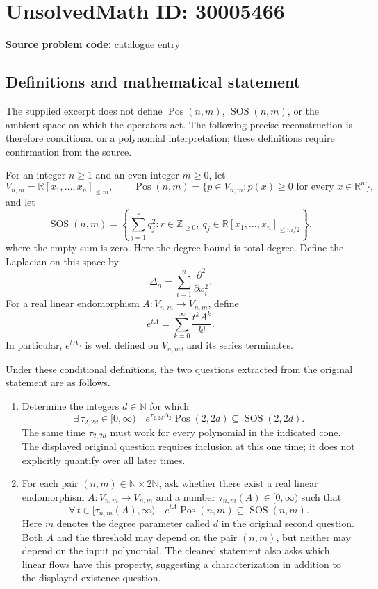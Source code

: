 \documentclass[11pt]{article}
\newcommand{\N}{\mathbb{N}}
\newcommand{\Z}{\mathbb{Z}}
\newcommand{\R}{\mathbb{R}}
\begin{document}
\section*{UnsolvedMath ID: 30005466}
\textbf{Source problem code:} catalogue entry
\subsection{Definitions and mathematical statement}
The supplied excerpt does not define \(\operatorname{Pos}(n,m)\), \(\operatorname{SOS}(n,m)\), or the ambient space on which the operators act. The following precise reconstruction is therefore conditional on a polynomial interpretation; these definitions require confirmation from the source.

For an integer \(n\geq 1\) and an even integer \(m\geq 0\), let
\[
V_{n,m}=\R[x_1,\ldots,x_n]_{\leq m},
\qquad
\operatorname{Pos}(n,m)=\{p\in V_{n,m}:p(x)\geq 0\text{ for every }x\in\R^n\},
\]
and let
\[
\operatorname{SOS}(n,m)=\left\{\sum_{j=1}^{r}q_j^2:r\in\Z_{\geq 0},\ q_j\in\R[x_1,\ldots,x_n]_{\leq m/2}\right\},
\]
where the empty sum is zero. Here the degree bound is total degree. Define the Laplacian on this space by
\[
\Delta_n=\sum_{i=1}^{n}\frac{\partial^2}{\partial x_i^2}.
\]
For a real linear endomorphism \(A:V_{n,m}\to V_{n,m}\), define
\[
e^{tA}=\sum_{k=0}^{\infty}\frac{t^kA^k}{k!}.
\]
In particular, \(e^{t\Delta_n}\) is well defined on \(V_{n,m}\), and its series terminates.

Under these conditional definitions, the two questions extracted from the original statement are as follows.
\begin{enumerate}
\item Determine the integers \(d\in\N\) for which
\[
\exists\,\tau_{2,2d}\in[0,\infty)\quad
 e^{\tau_{2,2d}\Delta_2}\operatorname{Pos}(2,2d)
 \subseteq\operatorname{SOS}(2,2d).
\]
The same time \(\tau_{2,2d}\) must work for every polynomial in the indicated cone. The displayed original question requires inclusion at this one time; it does not explicitly quantify over all later times.
\item For each pair \((n,m)\in\N\times2\N\), ask whether there exist a real linear endomorphism \(A:V_{n,m}\to V_{n,m}\) and a number \(\tau_{n,m}(A)\in[0,\infty)\) such that
\[
\forall\,t\in[\tau_{n,m}(A),\infty)\quad
 e^{tA}\operatorname{Pos}(n,m)
 \subseteq\operatorname{SOS}(n,m).
\]
Here \(m\) denotes the degree parameter called \(d\) in the original second question. Both \(A\) and the threshold may depend on the pair \((n,m)\), but neither may depend on the input polynomial. The cleaned statement also asks which linear flows have this property, suggesting a characterization in addition to the displayed existence question.
\end{enumerate}
\end{document}
